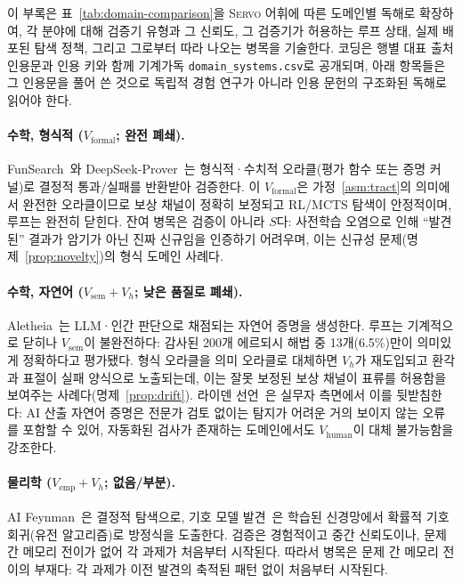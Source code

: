 \documentclass[11pt]{article}
\newcommand{\framework}{\textsc{Servo}}
\begin{document}
이 부록은 표~\ref{tab:domain-comparison}을 \framework{} 어휘에 따른 도메인별 독해로 확장하여, 각 분야에 대해 검증기 유형과 그 신뢰도, 그 검증기가 허용하는 루프 상태, 실제 배포된 탐색 정책, 그리고 그로부터 따라 나오는 병목을 기술한다. 코딩은 행별 대표 출처 인용문과 인용 키와 함께 기계가독 \texttt{domain\_systems.csv}로 공개되며, 아래 항목들은 그 인용문을 풀어 쓴 것으로 독립적 경험 연구가 아니라 인용 문헌의 구조화된 독해로 읽어야 한다.

\paragraph{수학, 형식적 ($V_\text{formal}$; 완전 폐쇄).} FunSearch~\citep{romera2023funsearch}와 DeepSeek-Prover~\citep{xin2024deepseek}는 형식적·수치적 오라클(평가 함수 또는 증명 커널)로 결정적 통과/실패를 반환받아 검증한다. 이 $V_\text{formal}$은 가정~\ref{asm:tract}의 의미에서 완전한 오라클이므로 보상 채널이 정확히 보정되고 RL/MCTS 탐색이 안정적이며, 루프는 완전히 닫힌다. 잔여 병목은 검증이 아니라 $S$다: 사전학습 오염으로 인해 ``발견된'' 결과가 암기가 아닌 진짜 신규임을 인증하기 어려우며, 이는 신규성 문제(명제~\ref{prop:novelty})의 형식 도메인 사례다.

\paragraph{수학, 자연어 ($V_\text{sem}+V_h$; 낮은 품질로 폐쇄).} Aletheia~\citep{google2026aletheia}는 LLM·인간 판단으로 채점되는 자연어 증명을 생성한다. 루프는 기계적으로 닫히나 $V_\text{sem}$이 불완전하다: 감사된 200개 에르되시 해법 중 13개(6.5\%)만이 의미있게 정확하다고 평가됐다. 형식 오라클을 의미 오라클로 대체하면 $V_h$가 재도입되고 환각과 표절이 실패 양식으로 노출되는데, 이는 잘못 보정된 보상 채널이 표류를 허용함을 보여주는 사례다(명제~\ref{prop:drift}). 라이덴 선언~\citep{leiden2026}은 실무자 측면에서 이를 뒷받침한다: AI 산출 자연어 증명은 전문가 검토 없이는 탐지가 어려운 거의 보이지 않는 오류를 포함할 수 있어, 자동화된 검사가 존재하는 도메인에서도 $V_\text{human}$이 대체 불가능함을 강조한다.

\paragraph{물리학 ($V_\text{emp}+V_h$; 없음/부분).} AI Feynman~\citep{udrescu2020afeynman}은 결정적 탐색으로, 기호 모델 발견~\citep{cranmer2020symbolic}은 학습된 신경망에서 확률적 기호회귀(유전 알고리즘)로 방정식을 도출한다. 검증은 경험적이고 중간 신뢰도이나, 문제 간 메모리 전이가 없어 각 과제가 처음부터 시작된다. 따라서 병목은 문제 간 메모리 전이의 부재다: 각 과제가 이전 발견의 축적된 패턴 없이 처음부터 시작된다.
\end{document}
